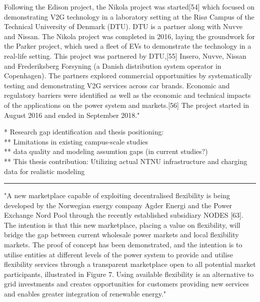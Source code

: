 Following the Edison project, the Nikola project was started[54] which focused on demonstrating V2G technology in a laboratory setting at the Risø Campus of the Technical University of Denmark (DTU). DTU is a partner along with Nuvve and Nissan. The Nikola project was completed in 2016, laying the groundwork for the Parker project, which used a fleet of EVs to demonstrate the technology in a real-life setting. This project was partnered by DTU,[55] Insero, Nuvve, Nissan and Frederiksberg Forsyning (a Danish distribution system operator in Copenhagen). The partners explored commercial opportunities by systematically testing and demonstrating V2G services across car brands. Economic and regulatory barriers were identified as well as the economic and technical impacts of the applications on the power system and markets.[56] The project started in August 2016 and ended in September 2018." \\


* Research gap identification and thesis positioning: \\
** Limitations in existing campus-scale studies \\
** data quality and modeling assumtion gaps (in current studies?) \\
** This thesis contribution: Utilizing actual NTNU infrastructure and charging data for realistic modeling 


\hrule

"A new marketplace capable of exploiting decentralised flexibility is being developed by the Norwegian energy company Agder Energi and the Power Exchange Nord Pool through the recently established subsidiary NODES [63]. The intention is that this new marketplace, placing a value on flexibility, will bridge the gap between current wholesale power markets and local flexibility markets. The proof of concept has been demonstrated, and the intention is to utilise entities at different levels of the power system to provide and utilise flexibility services through a transparent marketplace open to all potential market participants, illustrated in Figure 7. Using available flexibility is an alternative to grid investments and creates opportunities for customers providing new services and enables greater integration of renewable energy." \cite{emil_hillberg_flexibility_2019}

